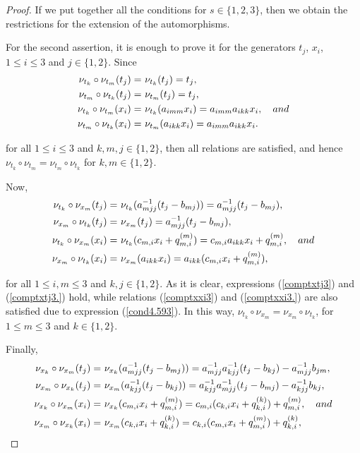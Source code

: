 \documentclass{amsart}
\theoremstyle{definition}
\theoremstyle{remark}
\numberwithin{equation}{section}
\begin{document}
\begin{proof}
If we put together all the conditions for $s \in \{1, 2, 3\}$, then we obtain the restrictions for the extension of the automorphisms.

For the second assertion, it is enough to prove it for the generators $t_j$, $x_i$, $1\leq i \leq 3$ and $j \in \{1, 2\}$. Since
\begin{align}
    \nu_{t_k} \circ \nu_{t_m}(t_j) = &\ \nu_{t_k}(t_j)=t_j, \label{comptttj3}\\
    \nu_{t_m} \circ \nu_{t_k}(t_j) = &\ \nu_{t_m}(t_j)=t_j, \label{comptttj3.} \\
    \nu_{t_k} \circ \nu_{t_m}(x_i) = &\ \nu_{t_k}(a_{imm}x_i)=a_{imm}a_{ikk}x_i, \quad {\rm and}  \label{compttxi3}\\
    \nu_{t_m} \circ \nu_{t_k}(x_i) = &\ \nu_{t_m}(a_{ikk}x_i)=a_{imm}a_{ikk}x_i. \label{compttxi3.}
\end{align}

for all $1\leq i \leq 3$ and $k,m,j \in \{1, 2\}$, then all relations are satisfied, and hence $\nu_{t_k} \circ \nu_{t_m} = \nu_{t_m} \circ \nu_{t_k}$ for $k,m \in \{1, 2\}$.

Now, 
\begin{align}
    \nu_{t_k} \circ \nu_{x_m}(t_j) = &\ \nu_{t_k}(a_{mjj}^{-1}(t_j-b_{mj}))=a_{mjj}^{-1}(t_j-b_{mj}), \label{comptxtj3}\\
    \nu_{x_m} \circ \nu_{t_k}(t_j) = &\ \nu_{x_m}(t_j)=a_{mjj}^{-1}(t_j-b_{mj}), \label{comptxtj3.} \\
    \nu_{t_k} \circ \nu_{x_m}(x_i) = &\ \nu_{t_k}(c_{m,i}x_i+q_{m,i}^{(m)})=c_{m,i}a_{ikk}x_i+q_{m,i}^{(m)}, \label{comptxxi3} \quad {\rm and} \\
    \nu_{x_m} \circ \nu_{t_k}(x_i) = &\ \nu_{x_m}(a_{ikk}x_i)=a_{ikk}(c_{m,i}x_i+q_{m,i}^{(m)}), \label{comptxxi3.}
\end{align}

for all $1\leq i,m \leq 3$ and $k,j \in \{1, 2\}$. As it is clear, expressions {\rm (}\ref{comptxtj3}{\rm )} and {\rm (}\ref{comptxtj3.}{\rm )} hold, while relations {\rm (}\ref{comptxxi3}{\rm )} and {\rm (}\ref{comptxxi3.}{\rm )} are also satisfied due to expression {\rm (}\ref{cond4.593}{\rm )}. In this way, $\nu_{t_k} \circ \nu_{x_m} = \nu_{x_m} \circ \nu_{t_k}$, for  $1\leq m \leq 3$ and $k \in \{1, 2\}$.

Finally, 
\begin{align}
    \nu_{x_k} \circ \nu_{x_m}(t_j) = &\ \nu_{x_k}(a_{mjj}^{-1}(t_j-b_{mj}))=a_{mjj}^{-1}a_{kjj}^{-1}(t_j-b_{kj})-a_{mjj}^{-1}b_{jm}, \label{compxxtj3}\\
    \nu_{x_m} \circ \nu_{x_k}(t_j) = &\ \nu_{x_m}(a_{kjj}^{-1}(t_j-b_{kj}))=a_{kjj}^{-1}a_{mjj}^{-1}(t_j-b_{mj})-a_{kjj}^{-1}b_{kj}, \label{compxxtj3.} \\
    \nu_{x_k} \circ \nu_{x_m}(x_i) = &\ \nu_{x_k}(c_{m,i}x_i+q_{m,i}^{(m)})=c_{m,i}(c_{k,i}x_i+q_{k,i}^{(k)})+q_{m,i}^{(m)}, \quad {\rm and} \label{compxxxi3}\\
    \nu_{x_m} \circ \nu_{x_k}(x_i) = &\ \nu_{x_m}(c_{k,i}x_i+q_{k,i}^{(k)})=c_{k,i}(c_{m,i}x_i+q_{m,i}^{(m)})+q_{k,i}^{(k)}, \label{compxxxi3.}
\end{align}


\end{proof}
\end{document}
